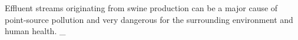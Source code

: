 Effluent streams originating from swine production can be a major cause of point-source pollution and very dangerous for the surrounding environment and human health. _